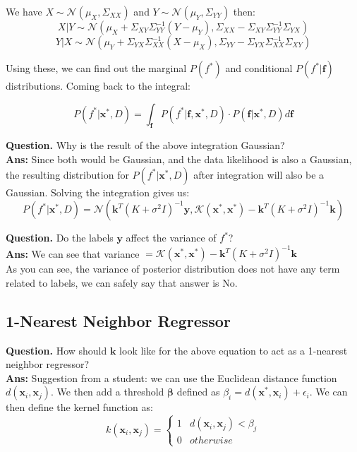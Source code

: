 \documentclass[12pt]{article}
\begin{document}
\noindent We have $X \sim \mathcal{N}(\mu_X,\Sigma_{XX})$ and $Y \sim \mathcal{N}(\mu_Y,\Sigma_{YY})$ then: \[ X | Y \sim \mathcal{N}(\mu_X + \Sigma_{XY} \Sigma^{-1}_{YY} (Y - \mu_Y), \Sigma_{XX} - \Sigma_{XY} \Sigma^{-1}_{YY} \Sigma_{YX}) \] \[ Y | X \sim \mathcal{N}(\mu_Y + \Sigma_{YX} \Sigma^{-1}_{XX} (X - \mu_X), \Sigma_{YY} - \Sigma_{YX} \Sigma^{-1}_{XX} \Sigma_{XY}) \]

\noindent Using these, we can find out the marginal $P(f^*)$ and conditional $P(f^*|\mathbf{f})$ distributions. Coming back to the integral:

\[ P(f^*|\mathbf{x}^*,D) = \int_{\mathbf{f}} P(f^*|\mathbf{f},\mathbf{x}^*,D) \cdot P(\mathbf{f}|\mathbf{x}^*,D) d\mathbf{f} \]

\noindent \textbf{Question.} Why is the result of the above integration Gaussian? \\
\noindent \textbf{Ans:\hspace{3mm}} Since both would be Gaussian, and the data likelihood is also a Gaussian, the resulting distribution for $P(f^*|\mathbf{x}^*,D)$ after integration will also be a Gaussian. Solving the integration gives us: \[ P(f^*|\mathbf{x}^*,D) = \mathcal{N} \left( \mathbf{k}^T (K + \sigma^2 I)^{-1} \mathbf{y}, \mathcal{K}(\mathbf{x}^*, \mathbf{x}^*) - \mathbf{k}^T (K + \sigma^2 I)^{-1} \mathbf{k} \right) \]

\vspace{1em}

\noindent \textbf{Question.} Do the labels $\mathbf{y}$ affect the variance of $f^*$?\\
\noindent \textbf{Ans:\hspace{3mm}} We can see that variance \( = \mathcal{K}(\mathbf{x}^*, \mathbf{x}^*) - \mathbf{k}^T (K + \sigma^2 I)^{-1} \mathbf{k} \)\\
As you can see, the variance of posterior distribution does not have any term related to labels, we can safely say that answer is No.

\subsection{1-Nearest Neighbor Regressor}

\textbf{Question.} How should $\mathbf{k}$ look like for the above equation to act as a 1-nearest neighbor regressor? \\
\noindent \textbf{Ans:\hspace{3mm}} Suggestion from a student: we can use the Euclidean distance function $d(\mathbf{x}_i,\mathbf{x}_j)$. We then add a threshold $\mathbf{\beta}$ defined as $\beta_i = d(\mathbf{x}^*,\mathbf{x}_i) + \epsilon_i$. We can then define the kernel function as: \[ k(\mathbf{x}_i,\mathbf{x}_j) = \begin{cases}
    1 & d(\mathbf{x}_i,\mathbf{x}_j) < \beta_j \\
    0 & otherwise
\end{cases} \]
\end{document}
